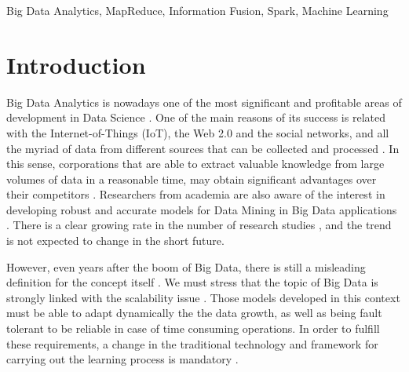\documentclass[3p,review]{elsarticle}
\begin{document}
\begin{frontmatter}
\begin{abstract}
			
		\end{abstract}
		
		\begin{keyword}
			Big Data Analytics, MapReduce, Information Fusion, Spark, Machine Learning
		\end{keyword}
		
	\end{frontmatter}
	
	\section{Introduction}\label{sec:intro}
	
	
	
	Big Data Analytics is nowadays one of the most significant and profitable areas of development in Data Science \cite{Chen12-BI-BD, Min13-BDAnalBook, Fer14,Chen14, Chen17-Book, davis17}. One of the main reasons of its success is related with the Internet-of-Things (IoT), the Web 2.0 and the social networks, and all the myriad of data from different sources that can be collected and processed \cite{davis17,Fuqaha15-IoT,OrgazJC16}. In this sense, corporations that are able to extract valuable knowledge from large volumes of data in a reasonable time, may obtain significant advantages over their competitors \cite{Lar16-BI,Choi17-BDAnal}. Researchers from academia are also aware of the interest in developing robust and accurate models for Data Mining in Big Data applications \cite{wu14, Wix14-BDAcad}. There is a clear growing rate in the number of research studies \cite{Abb16-BDIS,Chen16}, and the trend is not expected to change in the short future.
	
	However, even years after the boom of Big Data, there is still a misleading definition for the concept itself \cite{Gan15-BDhype}. We must stress that the topic of Big Data is strongly linked with the scalability issue \cite{Hu14-ScalBDAnal}. Those models developed in this context must be able to adapt dynamically the the data growth, as well as being fault tolerant to be reliable in case of time consuming operations. In order to fulfill these requirements, a change in the traditional technology and framework for carrying out the learning process is mandatory \cite{ChenMZL14}. 
	
\end{document}
